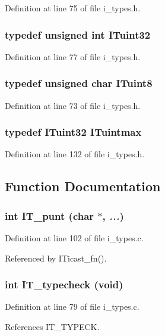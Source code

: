 Definition at line 75 of file i\_\-types.h.
\subsubsection{\setlength{\rightskip}{0pt plus 5cm}typedef unsigned int \bf{ITuint32}}\label{i__types_8h_51d3834dd4a74cd52ecb46f2fd334ff8}




Definition at line 77 of file i\_\-types.h.
\subsubsection{\setlength{\rightskip}{0pt plus 5cm}typedef unsigned char \bf{ITuint8}}\label{i__types_8h_03bffefd991080c3ea84932ede3a6afe}




Definition at line 73 of file i\_\-types.h.
\subsubsection{\setlength{\rightskip}{0pt plus 5cm}typedef \bf{ITuint32} \bf{ITuintmax}}\label{i__types_8h_23668bf0900ea5f74e1e1b1290d3ccf4}




Definition at line 132 of file i\_\-types.h.

\subsection{Function Documentation}
\subsubsection{\setlength{\rightskip}{0pt plus 5cm}int IT\_\-punt (char $\ast$,  {\em ...})}\label{i__types_8h_1fe0d06d4256bdc59e8577dd4d5329b8}




Definition at line 102 of file i\_\-types.c.

Referenced by ITicast\_\-fn().
\subsubsection{\setlength{\rightskip}{0pt plus 5cm}int IT\_\-typecheck (void)}\label{i__types_8h_352888fde1dec0606fa41bd24abc48f8}




Definition at line 79 of file i\_\-types.c.

References IT\_\-TYPECK.